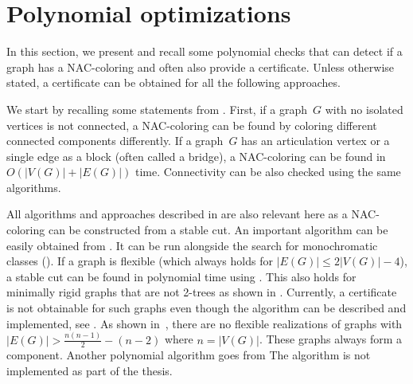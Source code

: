 \section{Polynomial optimizations}%
\label{sec:polynomial_optimizations}

In this section, we present and recall some polynomial checks
that can detect if a graph has a NAC-coloring and often also provide a certificate.
Unless otherwise stated, a certificate can be obtained for all the following approaches.

We start by recalling some statements from .
%
First, if a graph~\( G \) with no isolated vertices is not connected,
a NAC-coloring can be found by coloring different connected components differently.
%
If a graph~\( G \) has an articulation vertex or
a single edge as a block (often called a bridge),
a NAC-coloring can be found in \( O(|V(G)|+|E(G)|) \) time.
Connectivity can be also checked using the same algorithms.

All algorithms and approaches described in 
are also relevant here as a NAC-coloring can be constructed from a stable cut.
An important algorithm can be easily obtained from .
It can be run alongside the search for monochromatic classes ().
%
If a graph is flexible (which always holds for \( |E(G)| \le 2|V(G)|-4 \)),
a stable cut can be found in polynomial time using .
This also holds for minimally rigid graphs that are not 2-trees as shown in .
Currently, a certificate is not obtainable for such graphs
even though the algorithm can be described and implemented, see .
%
As shown in~\cite{legersky_original}, there are no flexible realizations
of graphs with \( |E(G)| > \frac{n(n-1)}{2} - (n-2) \) where \( n = |V(G)| \).
These graphs always form a \trcon{} component.
%
Another polynomial algorithm goes from 
The algorithm is not implemented as part of the thesis.

